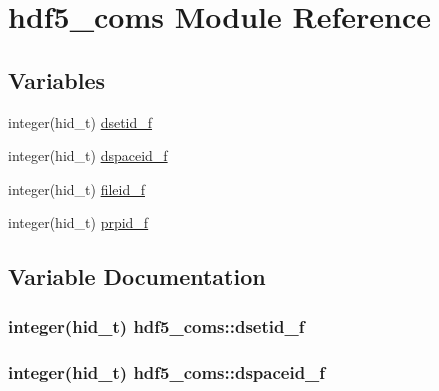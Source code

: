 \hypertarget{namespacehdf5__coms}{}\section{hdf5\+\_\+coms Module Reference}
\label{namespacehdf5__coms}
\subsection*{Variables}
\begin{DoxyCompactItemize}
\item 
integer(hid\+\_\+t) \hyperlink{namespacehdf5__coms_a31611e38319474913c7422e2cf240a25}{dsetid\+\_\+f}
\item 
integer(hid\+\_\+t) \hyperlink{namespacehdf5__coms_ad7b71a5a383dba57521ae99e69fe792c}{dspaceid\+\_\+f}
\item 
integer(hid\+\_\+t) \hyperlink{namespacehdf5__coms_a5bdf3f7a13856c782dc68d5c2bffccb4}{fileid\+\_\+f}
\item 
integer(hid\+\_\+t) \hyperlink{namespacehdf5__coms_a84009e52b52f9347b40c3e5d71cb1eb0}{prpid\+\_\+f}
\end{DoxyCompactItemize}


\subsection{Variable Documentation}
\subsubsection[{\texorpdfstring{dsetid\+\_\+f}{dsetid_f}}]{\setlength{\rightskip}{0pt plus 5cm}integer(hid\+\_\+t) hdf5\+\_\+coms\+::dsetid\+\_\+f}\hypertarget{namespacehdf5__coms_a31611e38319474913c7422e2cf240a25}{}\label{namespacehdf5__coms_a31611e38319474913c7422e2cf240a25}
\subsubsection[{\texorpdfstring{dspaceid\+\_\+f}{dspaceid_f}}]{\setlength{\rightskip}{0pt plus 5cm}integer(hid\+\_\+t) hdf5\+\_\+coms\+::dspaceid\+\_\+f}\hypertarget{namespacehdf5__coms_ad7b71a5a383dba57521ae99e69fe792c}{}\label{namespacehdf5__coms_ad7b71a5a383dba57521ae99e69fe792c}
